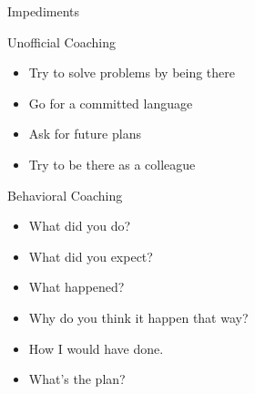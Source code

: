 \documentclass{beamer}
\begin{document}
\begin{frame}{Impediments}
\begin{description}
\end{description}
\end{frame}

\begin{frame}{Unofficial Coaching}
\begin{itemize}
\item Try to solve problems by being there
\item Go for a committed language
\item Ask for future plans
\item Try to be there as a colleague
\end{itemize}
\end{frame}

\begin{frame}{Behavioral Coaching}
\begin{itemize}
\item What did you do?
\item What did you expect?
\item What happened?
\item Why do you think it happen that way?
\item How I would have done.
\item What's the plan?
\end{itemize}
\end{frame}
\end{document}
